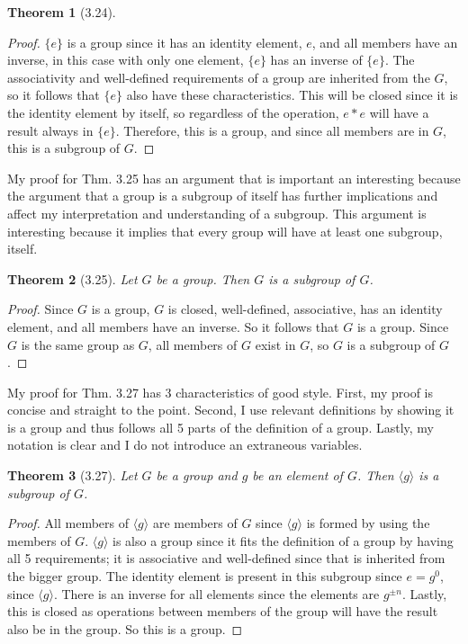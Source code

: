 \documentclass{article}
\newtheorem*{thm}{Theorem}
\begin{document}
\begin{description}
\begin{thm}[3.24]
		\end{thm}
	      \begin{proof}
	      $\{e\}$ is a group since it has an identity element, $e$, and all members have an inverse, in this case with only one element, $\{e\}$ has
	an inverse of $\{e\}$. The associativity and well-defined requirements of a group are inherited from the $G$, so it follows that $\{e\}$ also
	have these characteristics. This will be closed since it is the identity element by itself, so regardless of the operation, $e*e$ will
	have a result always in $\{e\}$. Therefore, this is a group, and since all members are in $G$, this is a subgroup of $G$.

	      \end{proof}

	      My proof for Thm. 3.25 has an argument that is important an interesting because the argument that a group is a subgroup of itself 
	      has further implications and affect my interpretation and understanding of a subgroup. 
	      This argument is interesting because it implies that every group will have at least one subgroup, itself. 
		\begin{thm}[3.25]
			Let $G$ be a group. Then $G$ is a subgroup of $G$. 

		\end{thm}
		\begin{proof}
		 Since $G$ is a group, $G$ is closed, well-defined, associative, has an identity element, and all members have an inverse. So it follows
	that $G$ is a group. Since $G$ is the same group as $G$, all members of $G$ exist in $G$, so $G$ is a subgroup of $G$.

		\end{proof}


		My proof for Thm. 3.27 has 3 characteristics of good style. First, my proof is concise and straight to the point.
		Second, I use relevant definitions by showing it is a group and thus follows all 5 parts of the definition of a group.
		Lastly, my notation is clear and I do not introduce an extraneous variables. 
		\begin{thm}[3.27]
		  	Let $G$ be a group and $g$ be an element of $G$. Then $\langle g \rangle$ is a subgroup of $G$. 

	      
		\end{thm}
	      \begin{proof}
	      All members of $\langle g \rangle$ are members of $G$ since $\langle g \rangle$ is formed by using the members of $G$. $\langle g \rangle$
	is also a group since it fits the definition of a group by having all 5 requirements; it is associative and well-defined since 
	that is inherited from the bigger group. The identity element 
	is present in this subgroup since $e = g^0$, since $\langle g \rangle$. 
	There is an inverse for all elements since the elements
	are $g^{\pm n}$. Lastly, this is closed as operations between members of the group will have the result also be in the group. So this is a 
	group. 
	      \end{proof}

\end{description}
\end{document}
